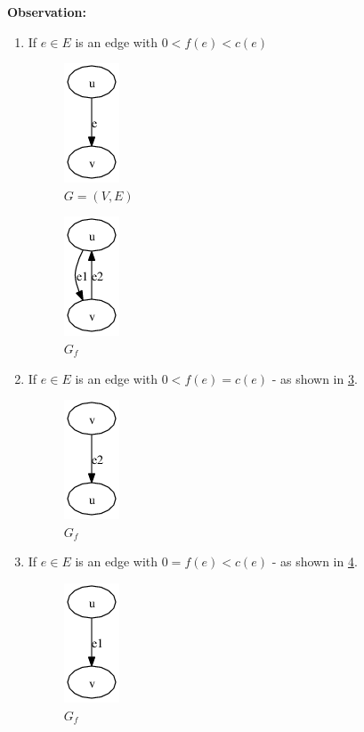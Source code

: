 \textbf{Observation:}\\
\begin{enumerate}[label=\alph*]
  \item 
  If $e \in E$ is an edge with $0 < f(e) < c(e)$\\
\begin{figure}[h]
\includegraphics[scale=0.45]{diagrams/graph5_4}
\caption{$G=(V,E)$}
\label{fig:G5}
\end{figure}  
\begin{figure}[h]
\includegraphics[scale=0.45]{diagrams/graph5_1}
\caption{$G{_f}$}
\label{fig:G6}
\end{figure}    

\item 
If $e \in E$ is an edge with $0 < f(e) = c(e)$ - as shown in \ref{fig:G7}.
\begin{figure}[h]
\includegraphics[scale=0.45]{diagrams/graph5_5}
\caption{$G{_f}$}
\label{fig:G7}
\end{figure}

\item
If $e \in E$ is an edge with $0 = f(e) < c(e)$ - as shown in \ref{fig:G8}.
\begin{figure}[h]
\includegraphics[scale=0.45]{diagrams/graph5_6}
\caption{$G{_f}$}
\label{fig:G8}
\end{figure}


\end{enumerate}
